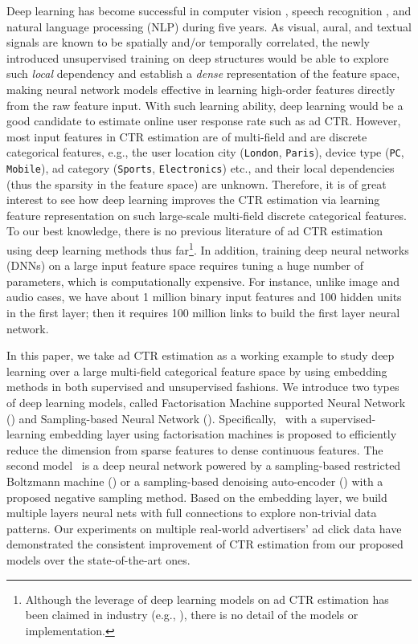 \documentclass{llncs}
\newcommand{\ft}{\texttt}
\newcommand{\fmnn}{\text{FNN}}
\newcommand{\snn}{\text{SNN}}
\newcommand{\snnrbm}{\text{SNN-RBM}}
\newcommand{\snndae}{\text{SNN-DAE}}
\begin{document}
Deep learning \cite{lecun2015deep} has become successful in computer vision \cite{krizhevsky2012imagenet},  speech recognition \cite{graves2013speech}, and natural language processing (NLP) \cite{huang2013learning,shen2014latent} during  five years. As visual, aural, and textual signals are known to be spatially and/or temporally correlated, the newly introduced unsupervised training on deep structures \cite{hinton2006reducing} would be able to explore such \emph{local} dependency and establish a \emph{dense} representation of the feature space, making neural network models effective in learning high-order features directly from the raw feature input.  With such learning ability, deep learning would be a good candidate to estimate online user response rate such as ad CTR. However, most input features in CTR estimation are of multi-field and are discrete categorical features, e.g., the user location city (\ft{London}, \ft{Paris}), device type (\ft{PC}, \ft{Mobile}), ad category (\ft{Sports}, \ft{Electronics}) etc., and their local dependencies (thus the sparsity in the feature space) are unknown.  Therefore, it is of great interest to see how deep learning improves the CTR estimation via learning feature representation on such large-scale multi-field discrete categorical features. To our best knowledge, there is no previous literature of ad CTR estimation using deep learning methods thus far\footnote{Although the leverage of deep learning models on ad CTR estimation has been claimed in industry (e.g., \cite{zou2014mariana}), there is no detail of the models or implementation.}. In addition, training deep neural networks (DNNs) on a large input feature space requires tuning a huge number of parameters, which is computationally expensive. For instance, unlike image and audio cases, we have about 1 million binary input features and 100 hidden units in the first layer; then it requires 100 million links to build the first layer neural network.

In this paper, we take ad CTR estimation as a working example to study deep learning over a large multi-field categorical feature space by using embedding methods in both supervised and unsupervised fashions. We introduce two types of deep learning models, called Factorisation Machine supported Neural Network (\fmnn) and Sampling-based Neural Network (\snn). Specifically, \fmnn~with a supervised-learning embedding layer using factorisation machines \cite{rendle2012factorization} is proposed to efficiently reduce the dimension from sparse features to dense continuous features. The second model \snn~is a deep neural network powered by a sampling-based restricted Boltzmann machine (\snnrbm) or a sampling-based denoising auto-encoder (\snndae) with a proposed negative sampling method. Based on the embedding layer, we build multiple layers neural nets with full connections to explore non-trivial data patterns. Our experiments on multiple real-world advertisers' ad click data have demonstrated the consistent improvement of CTR estimation from our proposed models over the state-of-the-art ones.
\end{document}
